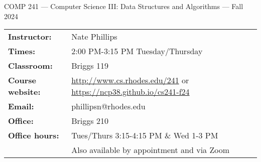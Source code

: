 \documentclass [letterpaper,11pt]{article}
\begin{document}
\begin{center}
\large COMP 241 --- Computer Science III: Data Structures and Algorithms --- Fall 2024
\end{center}

\noindent\begin{tabular}{@{}ll}
\textbf{Instructor:} & Nate Phillips \\
\textbf{Times:} & 2:00 PM-3:15 PM Tuesday/Thursday\\
\textbf{Classroom:} & Briggs 119 \\
\textbf{Course website:} & \url{http://www.cs.rhodes.edu/241} or \url{https://ncp38.github.io/cs241-f24}\\
\textbf{Email:} & phillipsn@rhodes.edu\\
\textbf{Office:} & Briggs 210\\
\textbf{Office hours:} & Tues/Thurs 3:15-4:15 PM \& Wed 1-3 PM \\ &Also available by appointment and via Zoom\\
\end{tabular}
\end{document}
